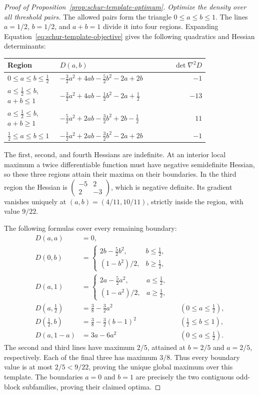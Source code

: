 \begin{proof}[Proof of Proposition~\ref{prop:schur-template-optimum}]
\textit{Optimize the density over all threshold pairs.}
The allowed pairs form the triangle $0\le a\le b\le1$.
The lines $a=1/2$, $b=1/2$, and $a+b=1$ divide it into four regions. Expanding
Equation~\eqref{eq:schur-template-objective} gives the following
quadratics and Hessian determinants:
\begin{center}
\small
\begin{tabular}{p{0.26\linewidth}p{0.54\linewidth}r}
\toprule
Region & $D(a,b)$ & $\det\nabla^2D$ \\
\midrule
$0\le a\le b\le\tfrac12$
& $-\tfrac32a^2+4ab-\tfrac52b^2-2a+2b$ & $-1$ \\
$a\le\tfrac12\le b$, $a+b\le1$
& $-\tfrac32a^2+4ab-\tfrac12b^2-2a+\tfrac12$ & $-13$ \\
$a\le\tfrac12\le b$, $a+b\ge1$
& $-\tfrac52a^2+2ab-\tfrac32b^2+2b-\tfrac12$ & $11$ \\
$\tfrac12\le a\le b\le1$
& $-\tfrac12a^2+2ab-\tfrac32b^2-2a+2b$ & $-1$ \\
\bottomrule
\end{tabular}
\end{center}
The first, second, and fourth Hessians are indefinite. At an interior
local maximum a twice differentiable function must have negative
semidefinite Hessian, so these three regions attain their maxima on
their boundaries. In the third region the Hessian is
$\left(\begin{smallmatrix}-5&2\\2&-3\end{smallmatrix}\right)$,
which is negative definite. Its gradient vanishes uniquely at
$(a,b)=(4/11,10/11)$, strictly inside the region, with value $9/22$.

The following formulas cover every remaining boundary:
\begin{align*}
 D(a,a)&=0,\\
 D(0,b)&=\begin{cases}2b-\tfrac52b^2,&b\le\tfrac12,\\
                    (1-b^2)/2,&b\ge\tfrac12,\end{cases}\\
 D(a,1)&=\begin{cases}2a-\tfrac52a^2,&a\le\tfrac12,\\
                    (1-a^2)/2,&a\ge\tfrac12,\end{cases}\\
 D(a,\tfrac12)&=\tfrac38-\tfrac32a^2
                  &&(0\le a\le\tfrac12),\\
 D(\tfrac12,b)&=\tfrac38-\tfrac32(b-1)^2
                  &&(\tfrac12\le b\le1),\\
 D(a,1-a)&=3a-6a^2
                  &&(0\le a\le\tfrac12).
\end{align*}
The second and third lines have maximum $2/5$, attained at $b=2/5$
and $a=2/5$, respectively. Each of the final three has maximum $3/8$.
Thus every boundary value is at most $2/5<9/22$, proving the unique
global maximum over this template. The boundaries $a=0$ and $b=1$
are precisely the two contiguous odd-block subfamilies, proving their
claimed optima.


\end{proof}
